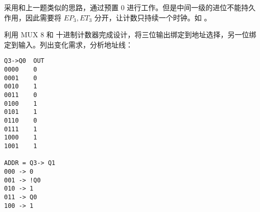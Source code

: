 \documentclass[lang=cn,11pt,a4paper,cite=authoryear]{elegantpaper}
\begin{document}

采用和上一题类似的思路，通过预置 0 进行工作。但是中间一级的进位不能持久作用，因此需要将 \(EP_3, ET_3\) 分开，让计数只持续一个时钟。如  。



利用 MUX 8 和 十进制计数器完成设计，将三位输出绑定到地址选择，另一位绑定到输入。列出变化需求，分析地址线：  

\begin{lstlisting}
Q3->Q0  OUT
0000    0
0001    0
0010    1
0011    0
0100    1
0101    1
0110    0
0111    1
1000    1
1001    1

ADDR = Q3-> Q1 
000 -> 0 
001 -> !Q0 
010 -> 1
011 -> Q0 
100 -> 1
\end{lstlisting}

\end{document}
